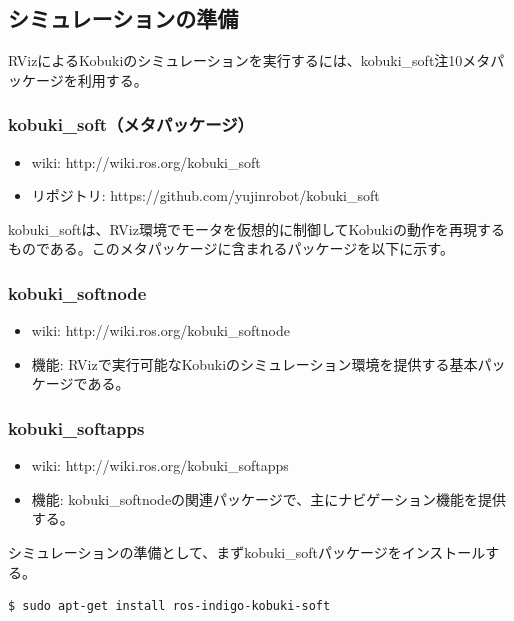 \begin{itemize}
\subsection{シミュレーションの準備}

RVizによるKobukiのシミュレーションを実行するには、kobuki\_soft注10メタパッケージを利用する。

\subsubsection{kobuki\_soft（メタパッケージ）}

\begin{itemize}
\item wiki: http://wiki.ros.org/kobuki\_soft
\item リポジトリ: https://github.com/yujinrobot/kobuki\_soft
\end{itemize}

kobuki\_softは、RViz環境でモータを仮想的に制御してKobukiの動作を再現するものである。このメタパッケージに含まれるパッケージを以下に示す。

\subsubsection{kobuki\_softnode}

\begin{itemize}
\item wiki: http://wiki.ros.org/kobuki\_softnode
\item 機能: RVizで実行可能なKobukiのシミュレーション環境を提供する基本パッケージである。
\end{itemize}

\subsubsection{kobuki\_softapps}

\begin{itemize}
\item wiki: http://wiki.ros.org/kobuki\_softapps
\item 機能: kobuki\_softnodeの関連パッケージで、主にナビゲーション機能を提供する。
\end{itemize}

シミュレーションの準備として、まずkobuki\_softパッケージをインストールする。

\begin{lstlisting}[language=ROS]
$ sudo apt-get install ros-indigo-kobuki-soft
\end{lstlisting}


\end{itemize}
